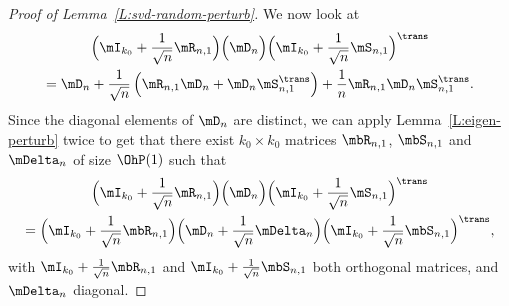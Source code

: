 \begin{proof}[Proof of Lemma~\ref{L:svd-random-perturb}]
    We now look at
    \begin{multline*}
        \Big(
            \mI_{k_0}
            +
            \frac{1}{\sqrt{n}}
            \mR_{n,1}
        \Big)
        \Big(
            \mD_n
        \Big)
        \Big(
            \mI_{k_0}
            +
            \frac{1}{\sqrt{n}}
            \mS_{n,1}
        \Big)^\trans \\
            =
                \mD_n
                +
                \frac{1}{\sqrt{n}}
                \left(
                    \mR_{n,1} \mD_n
                    +
                    \mD_n \mS_{n,1}^\trans
                \right)
                +
                \frac{1}{n}
                \mR_{n,1} \mD_n \mS_{n,1}^\trans.
    \end{multline*}
    Since the diagonal elements of $\mD_n$ are distinct, we can apply
    Lemma~\ref{L:eigen-perturb} twice to get that there exist
    $k_0 \times k_0$ matrices $\mbR_{n,1}$, $\mbS_{n,1}$ and $\mDelta_n$
    of size $\OhP(1)$ such that
    \begin{multline*}
        \Big(
            \mI_{k_0}
            +
            \frac{1}{\sqrt{n}}
            \mR_{n,1}
        \Big)
        \Big(
            \mD_n
        \Big)
        \Big(
            \mI_{k_0}
            +
            \frac{1}{\sqrt{n}}
            \mS_{n,1}
        \Big)^\trans \\
            =
                \Big(
                    \mI_{k_0}
                    +
                    \frac{1}{\sqrt{n}}
                    \mbR_{n,1}
                \Big)
                \Big(
                    \mD_n
                    +
                    \frac{1}{\sqrt{n}}
                    \mDelta_n
                \Big)
                \Big(
                    \mI_{k_0}
                    +
                    \frac{1}{\sqrt{n}}
                    \mbS_{n,1}
                \Big)^\trans,
    \end{multline*}
    with 
    \(
        \mI_{k_0}
        +
        \frac{1}{\sqrt{n}}
        \mbR_{n,1}
    \)
    and
    \(
        \mI_{k_0}
        +
        \frac{1}{\sqrt{n}}
        \mbS_{n,1}
    \)
    both orthogonal matrices, and $\mDelta_n$ diagonal.
    

\end{proof}
